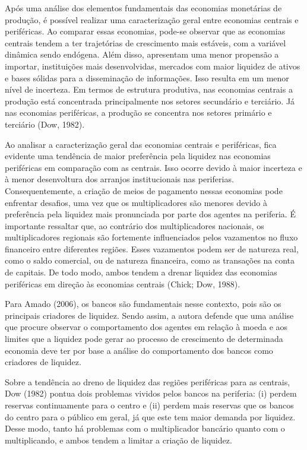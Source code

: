 \documentclass[a4paper,12pt]{article}
\begin{document}
Após uma análise dos elementos fundamentais das economias monetárias de
produção, é possível realizar uma caracterização geral entre economias
centrais e periféricas. Ao comparar essas economias, pode-se observar
que as economias centrais tendem a ter trajetórias de crescimento mais
estáveis, com a variável dinâmica sendo endógena. Além disso, apresentam
uma menor propensão a importar, instituições mais desenvolvidas,
mercados com maior liquidez de ativos e bases sólidas para a
disseminação de informações. Isso resulta em um menor nível de
incerteza. Em termos de estrutura produtiva, nas economias centrais a
produção está concentrada principalmente nos setores secundário e
terciário. Já nas economias periféricas, a produção se concentra nos
setores primário e terciário (Dow, 1982).

Ao analisar a caracterização geral das economias centrais e periféricas,
fica evidente uma tendência de maior preferência pela liquidez nas
economias periféricas em comparação com as centrais. Isso ocorre devido
à maior incerteza e à menor desenvoltura dos arranjos institucionais nas
periferias. Consequentemente, a criação de meios de pagamento nessas
economias pode enfrentar desafios, uma vez que os multiplicadores são
menores devido à preferência pela liquidez mais pronunciada por parte
dos agentes na periferia. É importante ressaltar que, ao contrário dos
multiplicadores nacionais, os multiplicadores regionais são fortemente
influenciados pelos vazamentos no fluxo financeiro entre diferentes
regiões. Esses vazamentos podem ser de natureza real, como o saldo
comercial, ou de natureza financeira, como as transações na conta de
capitais. De todo modo, ambos tendem a drenar liquidez das economias
periféricas em direção às economias centrais (Chick; Dow, 1988).

Para Amado (2006), os bancos são fundamentais nesse contexto, pois são
os principais criadores de liquidez. Sendo assim, a autora defende que
uma análise que procure observar o comportamento dos agentes em relação
à moeda e aos limites que a liquidez pode gerar ao processo de
crescimento de determinada economia deve ter por base a análise do
comportamento dos bancos como criadores de liquidez.

Sobre a tendência ao dreno de liquidez das regiões periféricas para as
centrais, Dow (1982) pontua dois problemas vividos pelos bancos na
periferia: (i) perdem reservas continuamente para o centro e (ii) perdem
mais reservas que os bancos do centro para o público em geral, já que
este tem maior demanda por liquidez. Desse modo, tanto há problemas com
o multiplicador bancário quanto com o multiplicando, e ambos tendem a
limitar a criação de liquidez.
\end{document}
